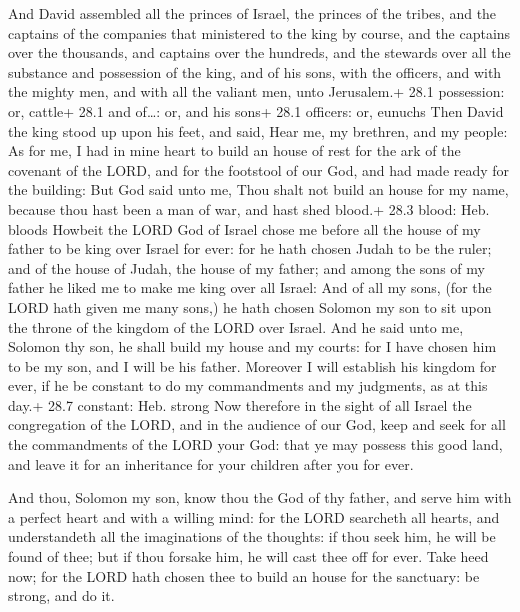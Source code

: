  And David assembled all the princes of Israel, the princes
of the tribes, and the captains of the companies that ministered to the
king by course, and the captains over the thousands, and captains over
the hundreds, and the stewards over all the substance and possession of
the king, and of his sons, with the officers, and with the mighty men,
and with all the valiant men, unto Jerusalem.+ 28.1 possession: or,
cattle+ 28.1 and of\ldots: or, and his sons+ 28.1 officers: or, eunuchs
 Then David the king stood up upon his feet, and said, Hear
me, my brethren, and my people: As for me, I had in mine heart to build
an house of rest for the ark of the covenant of the LORD, and for the
footstool of our God, and had made ready for the building: 
But God said unto me, Thou shalt not build an house for my name, because
thou hast been a man of war, and hast shed blood.+ 28.3 blood: Heb.
bloods  Howbeit the LORD God of Israel chose me before all
the house of my father to be king over Israel for ever: for he hath
chosen Judah to be the ruler; and of the house of Judah, the house of my
father; and among the sons of my father he liked me to make me king over
all Israel:  And of all my sons, (for the LORD hath given me
many sons,) he hath chosen Solomon my son to sit upon the throne of the
kingdom of the LORD over Israel.  And he said unto me,
Solomon thy son, he shall build my house and my courts: for I have
chosen him to be my son, and I will be his father.  Moreover
I will establish his kingdom for ever, if he be constant to do my
commandments and my judgments, as at this day.+ 28.7 constant: Heb.
strong  Now therefore in the sight of all Israel the
congregation of the LORD, and in the audience of our God, keep and seek
for all the commandments of the LORD your God: that ye may possess this
good land, and leave it for an inheritance for your children after you
for ever.

 And thou, Solomon my son, know thou the God of thy
father, and serve him with a perfect heart and with a willing mind: for
the LORD searcheth all hearts, and understandeth all the imaginations of
the thoughts: if thou seek him, he will be found of thee; but if thou
forsake him, he will cast thee off for ever.  Take heed
now; for the LORD hath chosen thee to build an house for the sanctuary:
be strong, and do it.


